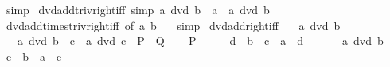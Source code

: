 \begin{isabellebody}
\ simp%
\endisatagproof
{\isafoldproof}%
%
\isadelimproof
\isanewline
%
\endisadelimproof
\isanewline
{}\isamarkupfalse%
\ dvd{\isacharunderscore}{\kern0pt}add{\isacharunderscore}{\kern0pt}triv{\isacharunderscore}{\kern0pt}right{\isacharunderscore}{\kern0pt}iff\ {\isacharbrackleft}{\kern0pt}simp{\isacharbrackright}{\kern0pt}{\isacharcolon}{\kern0pt}\ {\isachardoublequoteopen}a\ dvd\ b\ {\isacharplus}{\kern0pt}\ a\ {\isasymlongleftrightarrow}\ a\ dvd\ b{\isachardoublequoteclose}\isanewline
%
\isadelimproof
\ \ %
\endisadelimproof
%
\isatagproof
{}\isamarkupfalse%
\ dvd{\isacharunderscore}{\kern0pt}add{\isacharunderscore}{\kern0pt}times{\isacharunderscore}{\kern0pt}triv{\isacharunderscore}{\kern0pt}right{\isacharunderscore}{\kern0pt}iff\ {\isacharbrackleft}{\kern0pt}of\ a\ b\ {}{\isacharbrackright}{\kern0pt}\ \isamarkupfalse%
\ simp%
\endisatagproof
{\isafoldproof}%
%
\isadelimproof
\isanewline
%
\endisadelimproof
\isanewline
{}\isamarkupfalse%
\ dvd{\isacharunderscore}{\kern0pt}add{\isacharunderscore}{\kern0pt}right{\isacharunderscore}{\kern0pt}iff{\isacharcolon}{\kern0pt}\isanewline
\ \ \ {\isachardoublequoteopen}a\ dvd\ b{\isachardoublequoteclose}\isanewline
\ \ \ {\isachardoublequoteopen}a\ dvd\ b\ {\isacharplus}{\kern0pt}\ c\ {\isasymlongleftrightarrow}\ a\ dvd\ c{\isachardoublequoteclose}\ {\isacharparenleft}{\kern0pt}\ {\isachardoublequoteopen}{\isacharquery}{\kern0pt}P\ {\isasymlongleftrightarrow}\ {\isacharquery}{\kern0pt}Q{\isachardoublequoteclose}{\isacharparenright}{\kern0pt}\isanewline
%
\isadelimproof
%
\endisadelimproof
%
\isatagproof
{}\isamarkupfalse%
\isanewline
\ \ \isamarkupfalse%
\ {\isacharquery}{\kern0pt}P\isanewline
\ \ \isamarkupfalse%
\ \isamarkupfalse%
\ d\ \ {\isachardoublequoteopen}b\ {\isacharplus}{\kern0pt}\ c\ {\isacharequal}{\kern0pt}\ a\ {\isacharasterisk}{\kern0pt}\ d{\isachardoublequoteclose}\ \isacommand{{\isachardot}{\kern0pt}{\isachardot}{\kern0pt}}\isamarkupfalse%
\isanewline
\ \ \isamarkupfalse%
\ \isamarkupfalse%
\ {\isacartoucheopen}a\ dvd\ b{\isacartoucheclose}\ \isamarkupfalse%
\ e\ \ {\isachardoublequoteopen}b\ {\isacharequal}{\kern0pt}\ a\ {\isacharasterisk}{\kern0pt}\ e{\isachardoublequoteclose}\ \isacommand{{\isachardot}{\kern0pt}{\isachardot}{\kern0pt}}\isamarkupfalse%
\isanewline
\ \ \isamarkupfalse%

\end{isabellebody}
